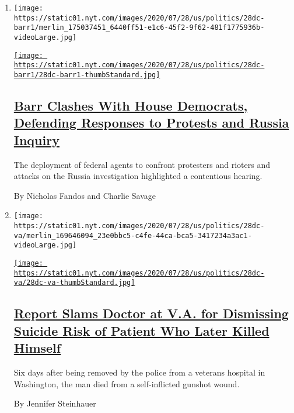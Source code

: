 \begin{enumerate}
\def\labelenumi{\arabic{enumi}.}
\item
  \texttt{[image: https://static01.nyt.com/images/2020/07/28/us/politics/28dc-barr1/merlin\_175037451\_6440ff51-e1c6-45f2-9f62-481f1775936b-videoLarge.jpg]}

  \href{/2020/07/28/us/politics/barr-testimony.html}{\texttt{[image: https://static01.nyt.com/images/2020/07/28/us/politics/28dc-barr1/28dc-barr1-thumbStandard.jpg]}}

  \hypertarget{barr-clashes-with-house-democrats-defending-responses-to-protests-and-russia-inquiry}{%
  \subsection{\texorpdfstring{\href{/2020/07/28/us/politics/barr-testimony.html}{Barr
  Clashes With House Democrats, Defending Responses to Protests and
  Russia
  Inquiry}}{Barr Clashes With House Democrats, Defending Responses to Protests and Russia Inquiry}}\label{barr-clashes-with-house-democrats-defending-responses-to-protests-and-russia-inquiry}}

  The deployment of federal agents to confront protesters and rioters
  and attacks on the Russia investigation highlighted a contentious
  hearing.

  By Nicholas Fandos and Charlie Savage
\item
  \texttt{[image: https://static01.nyt.com/images/2020/07/28/us/politics/28dc-va/merlin\_169646094\_23e0bbc5-c4fe-44ca-bca5-3417234a3ac1-videoLarge.jpg]}

  \href{/2020/07/28/us/politics/veterans-suicide.html}{\texttt{[image: https://static01.nyt.com/images/2020/07/28/us/politics/28dc-va/28dc-va-thumbStandard.jpg]}}

  \hypertarget{report-slams-doctor-at-va-for-dismissing-suicide-risk-of-patient-who-later-killed-himself}{%
  \subsection{\texorpdfstring{\href{/2020/07/28/us/politics/veterans-suicide.html}{Report
  Slams Doctor at V.A. for Dismissing Suicide Risk of Patient Who Later
  Killed
  Himself}}{Report Slams Doctor at V.A. for Dismissing Suicide Risk of Patient Who Later Killed Himself}}\label{report-slams-doctor-at-va-for-dismissing-suicide-risk-of-patient-who-later-killed-himself}}

  Six days after being removed by the police from a veterans hospital in
  Washington, the man died from a self-inflicted gunshot wound.

  By Jennifer Steinhauer
\end{enumerate}

